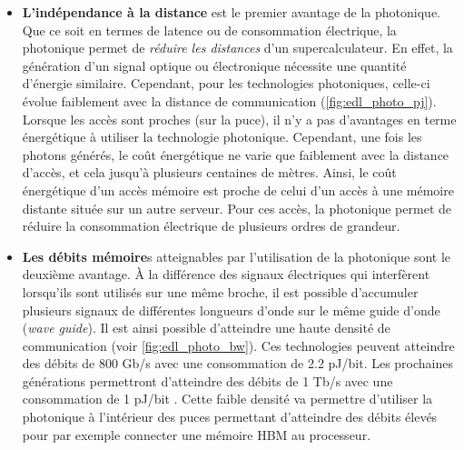         \begin{itemize}
            \item \textbf{L'indépendance à la distance} est le premier avantage de la photonique. Que ce soit en termes de latence ou de consommation électrique, la photonique permet de \textit{réduire les distances} d'un supercalculateur. En effet, la génération d'un signal optique ou électronique nécessite une quantité d'énergie similaire. Cependant, pour les technologies photoniques, celle-ci évolue faiblement avec la distance de communication (\autoref{fig:edl_photo_pj}). Lorsque les accès sont proches (sur la puce), il n'y a pas d'avantages en terme énergétique à utiliser la technologie photonique. Cependant, une fois les photons générés, le coût énergétique ne varie que faiblement avec la distance d'accès, et cela jusqu'à plusieurs centaines de mètres. Ainsi, le coût énergétique d'un accès mémoire est proche de celui d'un accès à une mémoire distante située sur un autre serveur. Pour ces accès, la photonique permet de réduire la consommation électrique de plusieurs ordres de grandeur. 
    
            \item \textbf{Les débits mémoire}s atteignables par l'utilisation de la photonique sont le deuxième avantage. À la différence des signaux électriques qui interfèrent lorsqu’ils sont utilisés sur une même broche, il est possible d’accumuler plusieurs signaux de différentes longueurs d’onde sur le même guide d’onde (\textit{wave guide}). Il est ainsi possible d'atteindre une haute densité de communication (voir \autoref{fig:edl_photo_bw}). Ces technologies peuvent atteindre des débits de 800 Gb/s avec une consommation de 2.2 pJ/bit. Les prochaines générations permettront d'atteindre des débits de 1 Tb/s  avec une consommation de 1 pJ/bit \cite{Bergman2018}. Cette faible densité va permettre d'utiliser la photonique à l'intérieur des puces permettant d'atteindre des débits élevés pour par exemple connecter une mémoire HBM au processeur.
        \end{itemize}
        
